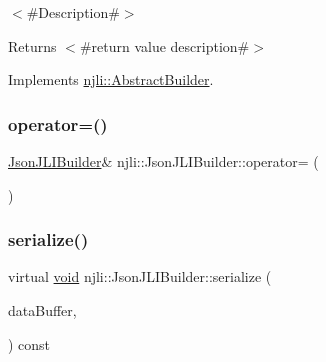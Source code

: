 $<$\#\+Description\#$>$

\begin{DoxyReturn}{Returns}
$<$\#return value description\#$>$ 
\end{DoxyReturn}


Implements \mbox{\hyperlink{classnjli_1_1_abstract_builder_a3e6e553e06d1ca30517ad5fb0bd4d000}{njli\+::\+Abstract\+Builder}}.

\mbox{\label{classnjli_1_1_json_j_l_i_builder_a305951bf3f57185cb22bebea68529f16}} 
\subsubsection{\texorpdfstring{operator=()}{operator=()}}
{\footnotesize\ttfamily \mbox{\hyperlink{classnjli_1_1_json_j_l_i_builder}{Json\+J\+L\+I\+Builder}}\& njli\+::\+Json\+J\+L\+I\+Builder\+::operator= (\begin{DoxyParamCaption}\item[{const \mbox{\hyperlink{classnjli_1_1_json_j_l_i_builder}{Json\+J\+L\+I\+Builder}} \&}]{ }\end{DoxyParamCaption})\hspace{0.3cm}{\ttfamily [protected]}}

\mbox{\label{classnjli_1_1_json_j_l_i_builder_a2012b3b2f65e5729d7a06365b749c1e9}} 
\subsubsection{\texorpdfstring{serialize()}{serialize()}}
{\footnotesize\ttfamily virtual \mbox{\hyperlink{_thread_8h_af1e856da2e658414cb2456cb6f7ebc66}{void}} njli\+::\+Json\+J\+L\+I\+Builder\+::serialize (\begin{DoxyParamCaption}\item[{\mbox{\hyperlink{_thread_8h_af1e856da2e658414cb2456cb6f7ebc66}{void}} $\ast$}]{data\+Buffer,  }\item[{bt\+Serializer $\ast$}]{ }\end{DoxyParamCaption}) const\hspace{0.3cm}{\ttfamily [virtual]}}



